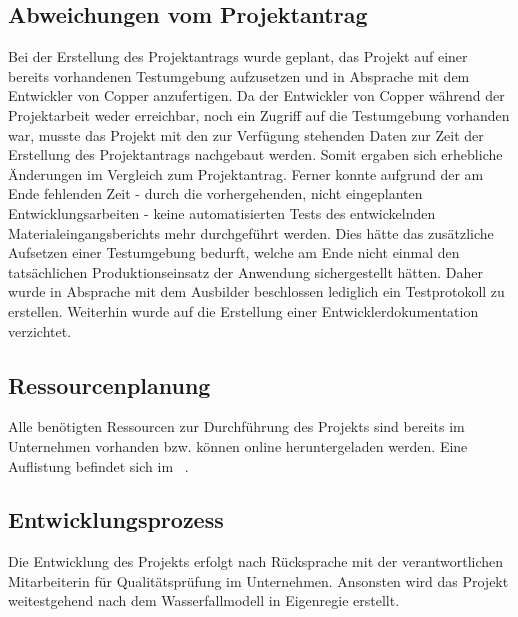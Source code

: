 \subsection{Abweichungen vom Projektantrag}
\label{sec:AbweichungenProjektantrag}
Bei der Erstellung des Projektantrags wurde geplant, das Projekt auf einer bereits vorhandenen Testumgebung aufzusetzen und in Absprache mit dem Entwickler von Copper anzufertigen. Da der Entwickler von Copper während der Projektarbeit weder erreichbar, noch ein Zugriff auf die Testumgebung vorhanden war, musste das Projekt mit den zur Verfügung stehenden Daten zur Zeit der Erstellung des Projektantrags nachgebaut werden. Somit ergaben sich erhebliche Änderungen im Vergleich zum Projektantrag. Ferner konnte aufgrund der am Ende fehlenden Zeit - durch die vorhergehenden, nicht eingeplanten Entwicklungsarbeiten - keine automatisierten Tests des entwickelnden Materialeingangsberichts mehr durchgeführt werden. Dies hätte das zusätzliche Aufsetzen einer Testumgebung bedurft, welche am Ende nicht einmal den tatsächlichen Produktionseinsatz der Anwendung sichergestellt hätten. Daher wurde in Absprache mit dem Ausbilder beschlossen lediglich ein Testprotokoll zu erstellen. Weiterhin wurde auf die Erstellung einer Entwicklerdokumentation verzichtet.

\subsection{Ressourcenplanung}
\label{sec:Ressourcenplanung}
Alle benötigten Ressourcen zur Durchführung des Projekts sind bereits im Unternehmen vorhanden bzw. können online heruntergeladen werden. Eine Auflistung befindet sich im ~.

\subsection{Entwicklungsprozess}
\label{sec:Entwicklungsprozess}
Die Entwicklung des Projekts  erfolgt nach Rücksprache mit der verantwortlichen Mitarbeiterin für Qualitätsprüfung im Unternehmen. Ansonsten wird das Projekt weitestgehend nach dem Wasserfallmodell in Eigenregie erstellt.
